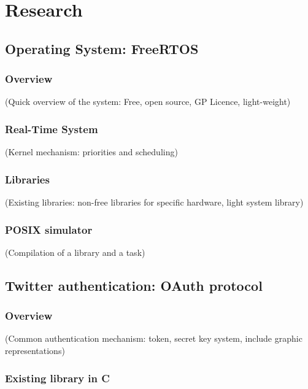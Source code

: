 \chapter{Research}

\section{Operating System: FreeRTOS}

\subsection{Overview}

(Quick overview of the system: Free, open source, GP Licence, light-weight)


\subsection{Real-Time System}

(Kernel mechanism: priorities and scheduling)


\subsection{Libraries}

(Existing libraries: non-free libraries for specific hardware, light system library)


\subsection{POSIX simulator}

(Compilation of a library and a task)



\section{Twitter authentication: OAuth protocol}

\subsection{Overview}

(Common authentication mechanism: token, secret key system, include graphic representations)


\subsection{Existing library in C}

